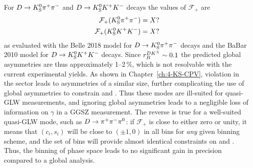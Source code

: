 For ${{D}\rightarrow{\ensuremath{{K}^0_{\mathrm{S}}}}{\ensuremath{{\pi}^+}}{\ensuremath{{\pi}^-}}}$ and ${D}\rightarrow{\ensuremath{{K}^0_{\mathrm{S}}}}{\ensuremath{{K}^+}}{\ensuremath{{K}^-}}$ decays the values of $\mathcal F_+$ are
\begin{align}
\begin{split}
    \mathcal F_+({{K}^0_{\mathrm{S}}}{{\pi}^+}{{\pi}^-}) = X? \\
    \mathcal F_+({{K}^0_{\mathrm{S}}}{{K}^+}{{K}^-}) = X?
\end{split}
\end{align}
as evaluated with the Belle 2018 model for ${{D}\rightarrow{\ensuremath{{K}^0_{\mathrm{S}}}}{\ensuremath{{\pi}^+}}{\ensuremath{{\pi}^-}}}$ decays and the BaBar 2010 model for ${D}\rightarrow{\ensuremath{{K}^0_{\mathrm{S}}}}{\ensuremath{{K}^+}}{\ensuremath{{K}^-}}$ decays. Since $r_B^{{{D}{{K}^\pm}}}\sim 0.1$ the predicted global asymmetries are thus approximately 1--2\,\%, which is not resolvable with the current experimental yields. As shown in Chapter~\ref{ch:4-KS-CPV}, \CP violation in the \KS sector leads to asymmetries of a similar size, further complicating the use of global asymmetries to constrain \xpm and \ypm. Thus these modes are ill-suited for quasi-GLW measurements, and ignoring global asymmetries leads to a negligible loss of information on $\gamma$ in a GGSZ measurement. The reverse is true for a well-suited quasi-GLW mode, such as ${D}\rightarrow{\ensuremath{{\pi}^+}}{\ensuremath{{\pi}^-}}{\ensuremath{{\pi}^0}}$: if $\mathcal F_+$ is close to either zero or unity, it means that $(c_i, s_i)$ will be close to $(\pm1, 0)$ in all bins for \emph{any} given binning scheme, and the set of bins will provide almost identical constraints on \xpm and \ypm. Thus, the binning of phase space leads to no significant gain in precision compared to a global analysis.


